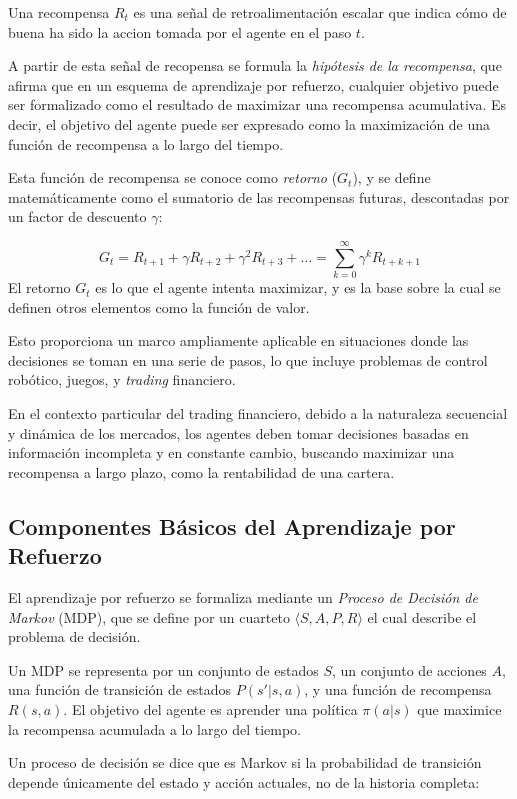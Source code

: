 \documentclass[a4paper,12pt, twoside]{report}
\begin{document}
Una recompensa \(R_t\) es una señal de retroalimentación escalar que indica cómo de buena ha sido la accion 
tomada por el agente en el paso \(t\). 

A partir de esta señal de recopensa se formula
la \textit{hipótesis de la recompensa}, que afirma que en un esquema de aprendizaje por refuerzo, cualquier 
objetivo puede ser formalizado como el resultado de maximizar una recompensa acumulativa. Es decir, el objetivo del agente puede ser expresado como la maximización de una función de recompensa a lo 
largo del tiempo.

Esta función de recompensa se conoce como \textit{retorno} (\(G_t\)), y se define matemáticamente como el sumatorio
de las recompensas futuras, descontadas por un factor de descuento  \(\gamma\):

\[
G_t = R_{t+1} + \gamma R_{t+2} + \gamma^2 R_{t+3} + \dots = \sum_{k=0}^{\infty} \gamma^k R_{t+k+1}
\]
El retorno \(G_t\) es lo que el agente intenta maximizar, y es la base sobre la cual se definen otros elementos como la función de valor.


Esto proporciona un marco ampliamente aplicable en situaciones donde 
las decisiones se toman en una serie de pasos, lo que incluye problemas de control robótico, juegos, 
y \textit{trading} financiero.

En el contexto particular del trading financiero, debido a la naturaleza secuencial y dinámica de 
los mercados, los agentes deben tomar decisiones basadas en información incompleta y en constante 
cambio, buscando maximizar una recompensa a largo plazo, como la rentabilidad de una cartera.


\subsection{Componentes Básicos del Aprendizaje por Refuerzo}

El aprendizaje por refuerzo se formaliza mediante un \textit{Proceso de Decisión de Markov} (MDP), 
que se define por un cuarteto \(\langle S, A, P, R \rangle\) el cual describe el problema de decisión.

Un MDP se representa por un conjunto de estados \(S\), 
un conjunto de acciones \(A\), una función de transición de estados \(P(s'|s, a)\), y una función de 
recompensa \(R(s, a)\). El objetivo del agente es aprender una política \(\pi(a|s)\) que maximice la 
recompensa acumulada a lo largo del tiempo.

Un proceso de decisión se dice que es Markov si la probabilidad de transición depende únicamente
del estado y acción actuales, no de la historia completa:
\end{document}
